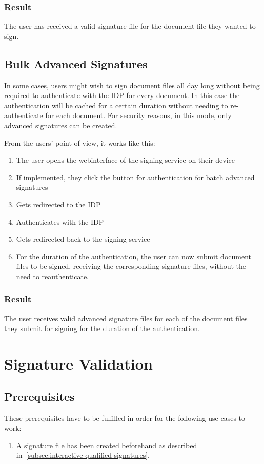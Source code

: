 \subsubsection{Result}
The user has received a valid signature file for the document file they wanted to sign.

\subsection{Bulk Advanced Signatures}\label{subsec:bulk-advanced-signatures}
In some cases, users might wish to sign document files all day long without being required to authenticate with the \gls{IDP} for every document.
In this case the authentication will be cached for a certain duration without needing to re-authenticate for each document.
For security reasons, in this mode, only advanced signatures can be created.

From the users' point of view, it works like this:
\begin{enumerate}
    \item The user opens the webinterface of the signing service on their device
    \item If implemented, they click the button for authentication for batch advanced signatures
    \item Gets redirected to the \gls{IDP}
    \item Authenticates with the \gls{IDP}
    \item Gets redirected back to the signing service
    \item For the duration of the authentication, the user can now submit document files to be signed,
        receiving the corresponding signature files, without the need to reauthenticate.
\end{enumerate}
\subsubsection{Result}
The user receives valid advanced signature files for each of the document files they submit for signing for the duration of the authentication.


\section{Signature Validation}\label{sec:signature-validation}

\subsection{Prerequisites}\label{subsec:prerequisites2}
These prerequisites have to be fulfilled in order for the following use cases to work:
\begin{enumerate}
    \item A signature file has been created beforehand as described in~\ref{subsec:interactive-qualified-signatures}.
\end{enumerate}

